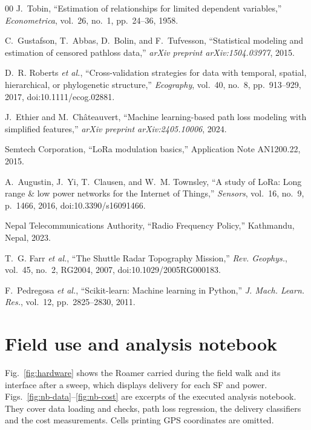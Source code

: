 \documentclass[conference]{IEEEtran}
\begin{document}
\begin{thebibliography}{00}
J.~Tobin, ``Estimation of relationships for limited dependent variables,'' \emph{Econometrica}, vol.~26, no.~1, pp.~24--36, 1958.

C.~Gustafson, T.~Abbas, D.~Bolin, and F.~Tufvesson, ``Statistical modeling and estimation of censored pathloss data,'' \emph{arXiv preprint arXiv:1504.03977}, 2015.

D.~R. Roberts \emph{et al.}, ``Cross-validation strategies for data with temporal, spatial, hierarchical, or phylogenetic structure,'' \emph{Ecography}, vol.~40, no.~8, pp.~913--929, 2017, doi:10.1111/ecog.02881.

J.~Ethier and M.~Châteauvert, ``Machine learning-based path loss modeling with simplified features,'' \emph{arXiv preprint arXiv:2405.10006}, 2024.

Semtech Corporation, ``LoRa modulation basics,'' Application Note AN1200.22, 2015.

A.~Augustin, J.~Yi, T.~Clausen, and W.~M. Townsley, ``A study of LoRa: Long range \& low power networks for the Internet of Things,'' \emph{Sensors}, vol.~16, no.~9, p.~1466, 2016, doi:10.3390/s16091466.

Nepal Telecommunications Authority, ``Radio Frequency Policy,'' Kathmandu, Nepal, 2023.

T.~G. Farr \emph{et al.}, ``The Shuttle Radar Topography Mission,'' \emph{Rev. Geophys.}, vol.~45, no.~2, RG2004, 2007, doi:10.1029/2005RG000183.

F.~Pedregosa \emph{et al.}, ``Scikit-learn: Machine learning in Python,'' \emph{J. Mach. Learn. Res.}, vol.~12, pp.~2825--2830, 2011.

\end{thebibliography}

\appendices
\section{Field use and analysis notebook}\label{app:hw}
Fig.~\ref{fig:hardware} shows the Roamer carried during the field walk and its interface after a sweep, which displays delivery for each SF and power. Figs.~\ref{fig:nb-data}--\ref{fig:nb-cost} are excerpts of the executed analysis notebook. They cover data loading and checks, path loss regression, the delivery classifiers and the cost measurements. Cells printing GPS coordinates are omitted.
\end{document}
